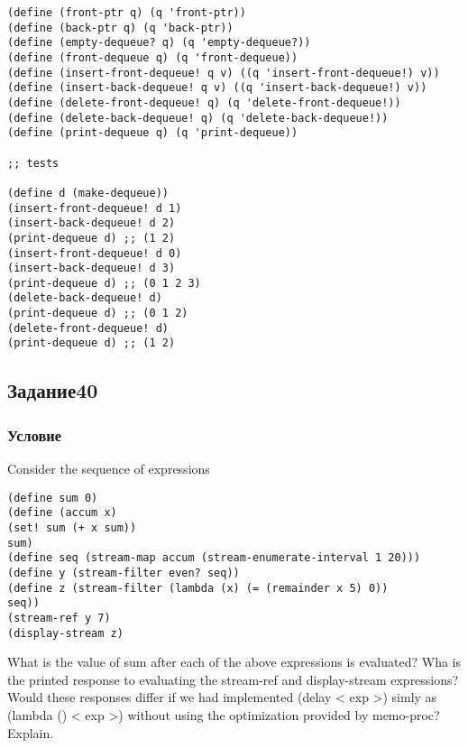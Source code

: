 \documentclass[10pt,a4paper]{article}
\begin{document}
\begin{lstlisting}
(define (front-ptr q) (q 'front-ptr))
(define (back-ptr q) (q 'back-ptr))
(define (empty-dequeue? q) (q 'empty-dequeue?))
(define (front-dequeue q) (q 'front-dequeue))
(define (insert-front-dequeue! q v) ((q 'insert-front-dequeue!) v))
(define (insert-back-dequeue! q v) ((q 'insert-back-dequeue!) v))
(define (delete-front-dequeue! q) (q 'delete-front-dequeue!))
(define (delete-back-dequeue! q) (q 'delete-back-dequeue!))
(define (print-dequeue q) (q 'print-dequeue))

;; tests

(define d (make-dequeue))
(insert-front-dequeue! d 1)
(insert-back-dequeue! d 2)
(print-dequeue d) ;; (1 2)
(insert-front-dequeue! d 0)
(insert-back-dequeue! d 3)
(print-dequeue d) ;; (0 1 2 3)
(delete-back-dequeue! d)
(print-dequeue d) ;; (0 1 2)
(delete-front-dequeue! d)
(print-dequeue d) ;; (1 2)

\end{lstlisting}


\subsection*{Задание40}
\subsubsection*{Условие}
Consider the sequence of expressions
\begin{lstlisting}
(define sum 0)
(define (accum x)
(set! sum (+ x sum))
sum)
(define seq (stream-map accum (stream-enumerate-interval 1 20)))
(define y (stream-filter even? seq))
(define z (stream-filter (lambda (x) (= (remainder x 5) 0))
seq))
(stream-ref y 7)
(display-stream z)
\end{lstlisting}
What is the value of sum after each of the above expressions is
evaluated? Wha is the printed response to evaluating the stream-ref
and display-stream expressions? Would these responses differ if we had
implemented (delay < exp >) simly as (lambda () < exp >) without using
the optimization provided by memo-proc? Explain.
\end{document}
